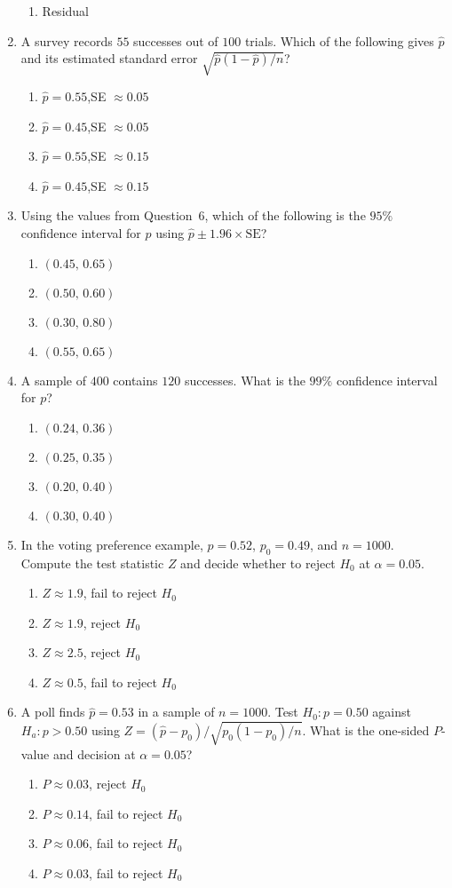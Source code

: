 \documentclass{article}
\begin{document}
\begin{enumerate}
\begin{enumerate}[label=(\Alph*)]
  \item Residual
  \end{enumerate}
\item A survey records $55$ successes out of $100$ trials. Which of the following gives $\hat{p}$ and its estimated standard error $\sqrt{\hat{p}(1-\hat{p})/n}$?
  \begin{enumerate}[label=(\Alph*)]
  \item $\hat{p}=0.55$,\quad SE $\approx0.05$
  \item $\hat{p}=0.45$,\quad SE $\approx0.05$
  \item $\hat{p}=0.55$,\quad SE $\approx0.15$
  \item $\hat{p}=0.45$,\quad SE $\approx0.15$
  \end{enumerate}
\item Using the values from Question~6, which of the following is the $95\%$ confidence interval for $p$ using $\hat{p}\pm1.96\times\text{SE}$?
  \begin{enumerate}[label=(\Alph*)]
  \item $(0.45,\,0.65)$
  \item $(0.50,\,0.60)$
  \item $(0.30,\,0.80)$
  \item $(0.55,\,0.65)$
  \end{enumerate}
\item A sample of $400$ contains $120$ successes. What is the $99\%$ confidence interval for $p$?
  \begin{enumerate}[label=(\Alph*)]
  \item $(0.24,\,0.36)$
  \item $(0.25,\,0.35)$
  \item $(0.20,\,0.40)$
  \item $(0.30,\,0.40)$
  \end{enumerate}
\item In the voting preference example, $\hat{p}=0.52$, $p_0=0.49$, and $n=1000$. Compute the test statistic $Z$ and decide whether to reject $H_0$ at $\alpha=0.05$.
  \begin{enumerate}[label=(\Alph*)]
  \item $Z\approx1.9$, fail to reject $H_0$
  \item $Z\approx1.9$, reject $H_0$
  \item $Z\approx2.5$, reject $H_0$
  \item $Z\approx0.5$, fail to reject $H_0$
  \end{enumerate}
\item A poll finds $\hat{p}=0.53$ in a sample of $n=1000$. Test $H_0:p=0.50$ against $H_a:p>0.50$ using $Z=(\hat{p}-p_0)/\sqrt{p_0(1-p_0)/n}$. What is the one-sided $P$-value and decision at $\alpha=0.05$?
  \begin{enumerate}[label=(\Alph*)]
  \item $P\approx0.03$, reject $H_0$
  \item $P\approx0.14$, fail to reject $H_0$
  \item $P\approx0.06$, fail to reject $H_0$
  \item $P\approx0.03$, fail to reject $H_0$
  \end{enumerate}
\end{enumerate}
\end{document}
